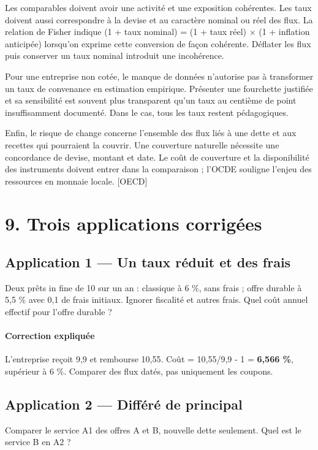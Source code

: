 \documentclass[12pt,a4paper]{article}
\begin{document}
Les comparables doivent avoir une activité et une exposition cohérentes. Les taux doivent aussi correspondre à la devise et au caractère nominal ou réel des flux. La relation de Fisher indique (1 + taux nominal) = (1 + taux réel) $\times$ (1 + inflation anticipée) lorsqu’on exprime cette conversion de façon cohérente. Déflater les flux puis conserver un taux nominal introduit une incohérence.


Pour une entreprise non cotée, le manque de données n’autorise pas à transformer un taux de convenance en estimation empirique. Présenter une fourchette justifiée et sa sensibilité est souvent plus transparent qu’un taux au centième de point insuffisamment documenté. Dans le cas, tous les taux restent pédagogiques.


Enfin, le risque de change concerne l’ensemble des flux liés à une dette et aux recettes qui pourraient la couvrir. Une couverture naturelle nécessite une concordance de devise, montant et date. Le coût de couverture et la disponibilité des instruments doivent entrer dans la comparaison ; l’OCDE souligne l’enjeu des ressources en monnaie locale. [OECD]

\section*{9. Trois applications corrigées}

\subsection*{Application 1 --- Un taux réduit et des frais}
Deux prêts in fine de 10 sur un an : classique à 6 \%, sans frais ; offre durable à 5,5 \% avec 0,1 de frais initiaux. Ignorer fiscalité et autres frais. Quel coût annuel effectif pour l’offre durable ?


\paragraph{Correction expliquée}
L’entreprise reçoit 9,9 et rembourse 10,55. Coût = 10,55/9,9 - 1 = \textbf{6,566 \%}, supérieur à 6 \%. Comparer des flux datés, pas uniquement les coupons.



\subsection*{Application 2 --- Différé de principal}
Comparer le service A1 des offres A et B, nouvelle dette seulement. Quel est le service B en A2 ?
\end{document}
